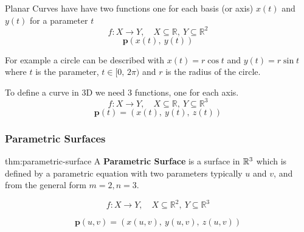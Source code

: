 \documentclass{article}
\begin{document}
Planar Curves have have two functions one for each basis (or axis) \(x(t)\) and \(y(t)\) for a parameter \(t\)
\[
    f: X \rightarrow Y, \quad X \subseteq \mathbb{R},\ Y \subseteq \mathbb{R}^2
\]
\[
    \mathbf{p}(x(t),\ y(t))
\]

For example a circle can be described with \(x(t) = r \cos t\) and \(y(t) = r \sin t\) where \(t\) is the parameter,
{\(t \in [0,\, 2\pi)\)} and \(r\) is the radius of the circle.
\begin{center}
\end{center}

To define a curve in 3D we need \(3\) functions, one for each axis.
\[
    f: X \rightarrow Y,\quad X \subseteq \mathbb{R},\ Y \subseteq \mathbb{R}^3
\]
\[
    \mathbf{p}(t) = (x(t),\ y(t),\ z(t))
\]

\newpage
\subsubsection{Parametric Surfaces}

\begin{defin}{thm:parametric-surface}
    A \textbf{Parametric Surface} is a surface in \(\mathbb{R}^{3}\) which is defined by a parametric equation with 
    two parameters typically \(u\) and \(v\), and from the general form \(m = 2, n = 3\).

    \[
        f: X \rightarrow Y, \quad X \subseteq \mathbb{R}^2,\ Y \subseteq \mathbb{R}^3
    \]

    \[
        \mathbf{p}(u,v) = (x(u,v), \ y(u,v), \ z(u,v))
    \]

\end{defin}
\end{document}
